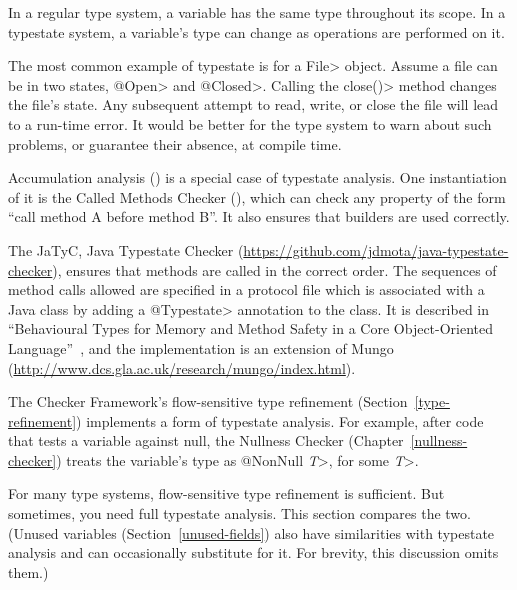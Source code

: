 
In a regular type system, a variable has the same type throughout its
scope.
In a typestate system, a variable's type can change as operations
are performed on it.

The most common example of typestate is for a \<File> object.  Assume a file
can be in two states, \<@Open> and \<@Closed>.  Calling the \<close()> method
changes the file's state.  Any subsequent attempt to read, write, or close
the file will lead to a run-time error.  It would be better for the type
system to warn about such problems, or guarantee their absence, at compile
time.

Accumulation analysis () is a special
case of typestate analysis.  One instantiation of it is the Called Methods
Checker (), which can check any
property of the form ``call method A before method B''.  It also ensures
that builders are used correctly.

The JaTyC, Java Typestate Checker
(\url{https://github.com/jdmota/java-typestate-checker}), ensures that
methods are called in the correct order. The sequences of method calls
allowed are specified in a protocol file which is associated with a Java
class by adding a \<@Typestate> annotation to the class.  It is described
in ``Behavioural Types for Memory and Method Safety in a Core
Object-Oriented Language''~\cite{BravettiFGHJKR2020}, and the
implementation is an extension of Mungo
(\url{http://www.dcs.gla.ac.uk/research/mungo/index.html}).



The Checker Framework's flow-sensitive type refinement
(Section~\ref{type-refinement}) implements a form of typestate analysis.
For example, after code that tests a variable against null, the Nullness
Checker (Chapter~\ref{nullness-checker}) treats the variable's type as
\<@NonNull \emph{T}>, for some \<\emph{T}>\@.

For many type systems, flow-sensitive type refinement is sufficient.  But
sometimes, you need full typestate analysis.  This section compares the
two.
(Unused variables
(Section~\ref{unused-fields})
also have similarities
with typestate analysis and can occasionally substitute for it.  For
brevity, this discussion omits them.)

